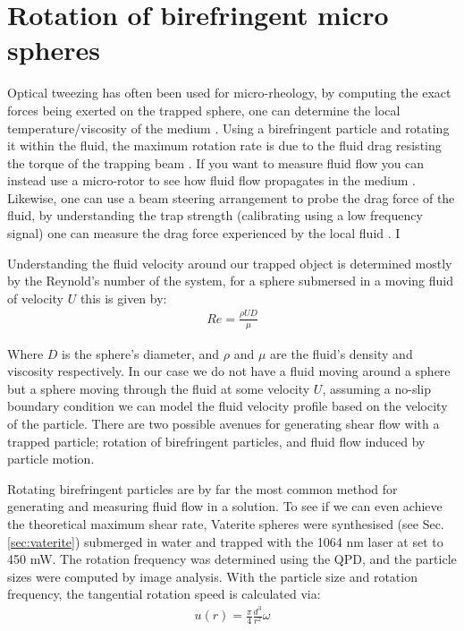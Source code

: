 \section{Rotation of birefringent micro spheres} 
Optical tweezing has often been used for micro-rheology, by computing the
exact forces being exerted on the trapped sphere, one can determine the
local temperature/viscosity of the medium \cite{Millen2014, RodriguezSevilla2018}.
Using a birefringent particle and rotating it within the fluid, the maximum 
rotation rate is due to the fluid drag resisting the torque of the trapping 
beam \cite{RodriguezSevilla2018}. If you want to measure fluid flow you can 
instead use a micro-rotor to see how fluid flow propagates in the medium \cite{Knoener2005}. Likewise, one can use a beam steering arrangement to 
probe the drag force of the fluid, by understanding the trap strength 
(calibrating using a low frequency signal) one can measure the drag force 
experienced by the local fluid \cite{RobertsonAnderson2018}. I

Understanding the fluid velocity around our trapped object is determined 
mostly by the Reynold's number of the system, for a sphere submersed in a 
moving fluid of velocity $U$ this is given by:
\begin{align}
	Re = \frac{\rho UD}{\mu}
\end{align}

Where $D$ is the sphere's diameter, and $\rho$ and $\mu$ are the fluid's 
density and viscosity respectively. In our case we do not have a fluid
moving around a sphere but a sphere moving through the fluid at some 
velocity $U$, assuming a no-slip boundary condition we can model the 
fluid velocity profile based on the velocity of the particle. There are 
two possible avenues for generating shear flow with a trapped particle; 
rotation of birefringent particles, and fluid flow induced by particle motion. 

Rotating birefringent particles are by far the most common method for 
generating and measuring fluid flow in a solution. To see if we can 
even achieve the theoretical maximum shear rate, Vaterite spheres 
were synthesised (see Sec.\ref{sec:vaterite}) submerged in water and 
trapped with the 1064 nm laser at set to 450 mW. The rotation frequency 
was determined using the QPD, and the particle sizes were computed 
by image analysis. With the particle size and rotation frequency, the 
tangential rotation speed is calculated via:
\begin{align}
	\label{eq:birefringent_speed}
	u(r) = \frac{\pi}{4}\frac{d^3}{r^2}\omega
\end{align}


